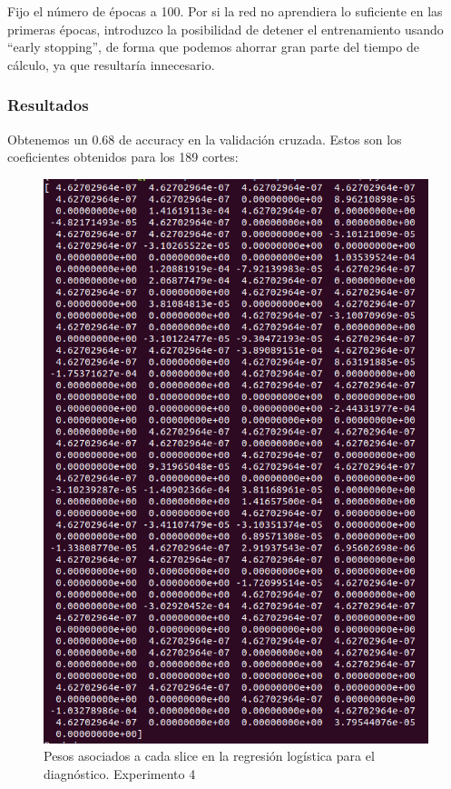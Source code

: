 Fijo el número de épocas a 100. Por si la red no aprendiera lo suficiente en las primeras épocas, introduzco la posibilidad de detener el entrenamiento usando ``early stopping'', de forma que podemos ahorrar gran parte del tiempo de cálculo, ya que resultaría innecesario. 

\subsubsection{Resultados}

Obtenemos un 0.68 de accuracy en la validación cruzada. Estos son los coeficientes obtenidos para los 189 cortes:

\begin{figure}[H] %
	\centering
	\includegraphics[scale=0.65]{probs-exp4.png}  %
	\caption{Pesos asociados a cada slice en la regresión logística para el diagnóstico. Experimento 4} 
	\label{fig:probs-exp4}
\end{figure}


